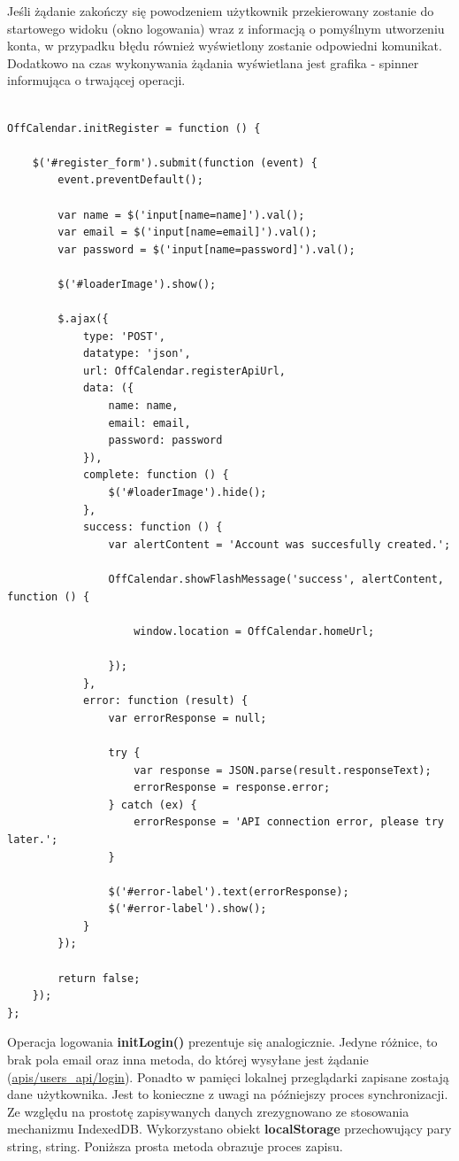 Jeśli żądanie zakończy się powodzeniem użytkownik przekierowany zostanie do startowego widoku (okno logowania) wraz z informacją o pomyślnym utworzeniu konta, w przypadku błędu również wyświetlony zostanie odpowiedni komunikat. Dodatkowo na czas wykonywania żądania wyświetlana jest grafika - spinner informująca o trwającej operacji.

\begin{lstlisting}[caption=Kod metody initRegister odpowiedzialnej za rejestrację użytkownika z wykorzystaniem API., label=amb, captionpos=b]

OffCalendar.initRegister = function () {

    $('#register_form').submit(function (event) {
        event.preventDefault();

        var name = $('input[name=name]').val();
        var email = $('input[name=email]').val();
        var password = $('input[name=password]').val();

        $('#loaderImage').show();

        $.ajax({
            type: 'POST',
            datatype: 'json',
            url: OffCalendar.registerApiUrl,
            data: ({
                name: name,
                email: email,
                password: password
            }),
            complete: function () {
                $('#loaderImage').hide();
            },
            success: function () {
                var alertContent = 'Account was succesfully created.';

                OffCalendar.showFlashMessage('success', alertContent, function () {

                    window.location = OffCalendar.homeUrl;

                });
            },
            error: function (result) {
                var errorResponse = null;

                try {
                    var response = JSON.parse(result.responseText);
                    errorResponse = response.error;
                } catch (ex) {
                    errorResponse = 'API connection error, please try later.';
                }

                $('#error-label').text(errorResponse);
                $('#error-label').show();
            }
        });

        return false;
    });
};

\end{lstlisting}

Operacja logowania \textbf{initLogin()} prezentuje się analogicznie. Jedyne różnice, to brak pola email oraz inna metoda, do której wysyłane jest żądanie (\url{apis/users_api/login}). Ponadto w pamięci lokalnej przeglądarki zapisane zostają dane użytkownika. Jest to konieczne z uwagi na późniejszy proces synchronizacji. Ze względu na prostotę zapisywanych danych zrezygnowano ze stosowania mechanizmu IndexedDB. Wykorzystano obiekt \textbf{localStorage} przechowujący pary string, string. Poniższa prosta metoda obrazuje proces zapisu.

